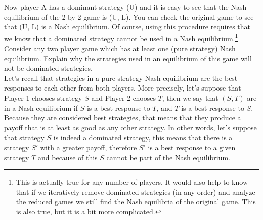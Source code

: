 \documentclass[twoside]{article}
\begin{document}
\begin{enumerate}
    Now player A has a dominant strategy (U) and it is easy to see that the Nash equilibrium of the 2-by-2 game is (U, L). You can check the original game to see that (U, L) is a Nash equilibrium. Of course, using this procedure requires that we know that a dominated strategy cannot be used in a Nash equilibrium.\footnote{This is actually true for any number of players. It would also help to know that if we iteratively remove dominated strategies (in any order) and analyze the reduced games we still find the Nash equilibria of the original game. This is also true, but it is a bit more complicated.} \\
    Consider any two player game which has at least one (pure strategy) Nash equilibrium. Explain why the strategies used in an equilibrium of this game will not be dominated strategies. \\
    
    Let's recall that strategies in a pure strategy Nash equilibrium are the best responses to each other from both players. More precisely, let's suppose that Player 1 chooses strategy $S$ and Player 2 chooses $T$, then we say that $(S, T)$ are in a Nash equilibrium if $S$ is a best response to $T$, and $T$ is a best response to $S$. Because they are considered best strategies, that means that they produce a payoff that is at least as good as any other strategy. In other words, let's suppose that strategy $S$ is indeed a dominated strategy, this means that there is a strategy $S\prime$ with a greater payoff, therefore $S\prime$ is a best response to a given strategy $T$ and because of this $S$ cannot be part of the Nash equilibrium.
    
\end{enumerate}
\end{document}
